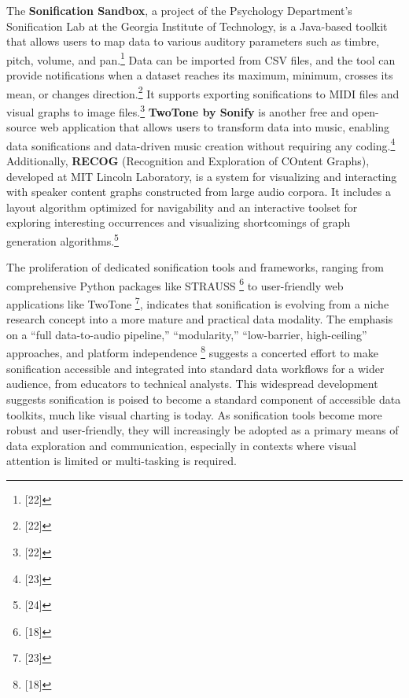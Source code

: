 The \textbf{Sonification Sandbox}, a project of the Psychology Department's Sonification Lab at the Georgia Institute of Technology, is a Java-based toolkit that allows users to map data to various auditory parameters such as timbre, pitch, volume, and pan.\footnote{[22]} Data can be imported from CSV files, and the tool can provide notifications when a dataset reaches its maximum, minimum, crosses its mean, or changes direction.\footnote{[22]} It supports exporting sonifications to MIDI files and visual graphs to image files.\footnote{[22]} \textbf{TwoTone by Sonify} is another free and open-source web application that allows users to transform data into music, enabling data sonifications and data-driven music creation without requiring any coding.\footnote{[23]} Additionally, \textbf{RECOG} (Recognition and Exploration of COntent Graphs), developed at MIT Lincoln Laboratory, is a system for visualizing and interacting with speaker content graphs constructed from large audio corpora. It includes a layout algorithm optimized for navigability and an interactive toolset for exploring interesting occurrences and visualizing shortcomings of graph generation algorithms.\footnote{[24]}

The proliferation of dedicated sonification tools and frameworks, ranging from comprehensive Python packages like STRAUSS \footnote{[18]} to user-friendly web applications like TwoTone \footnote{[23]}, indicates that sonification is evolving from a niche research concept into a more mature and practical data modality. The emphasis on a ``full data-to-audio pipeline,'' ``modularity,'' ``low-barrier, high-ceiling'' approaches, and platform independence \footnote{[18]} suggests a concerted effort to make sonification accessible and integrated into standard data workflows for a wider audience, from educators to technical analysts. This widespread development suggests sonification is poised to become a standard component of accessible data toolkits, much like visual charting is today. As sonification tools become more robust and user-friendly, they will increasingly be adopted as a primary means of data exploration and communication, especially in contexts where visual attention is limited or multi-tasking is required.


